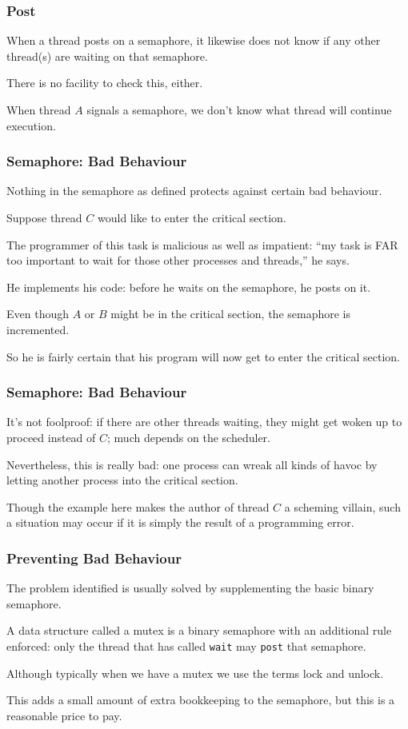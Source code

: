 \begin{frame}
	\frametitle{Post}

	When a thread posts on a semaphore, it likewise does not know if any other thread(s) are waiting on that semaphore.

	There is no facility to check this, either.

	When thread $A$ signals a semaphore, we don't know what thread will continue execution.


\end{frame}

\begin{frame}
	\frametitle{Semaphore: Bad Behaviour}

	Nothing in the semaphore as defined protects against certain bad behaviour.

	Suppose thread $C$ would like to enter the critical section.

	The programmer of this task is malicious as well as impatient: ``my task is FAR too important to wait for those other processes and threads,'' he says.

	He implements his code: before he waits on the semaphore, he posts on it.

	Even though $A$ or $B$ might be in the critical section, the semaphore is incremented.

	So he is fairly certain that his program will now get to enter the critical section.
\end{frame}

\begin{frame}
	\frametitle{Semaphore: Bad Behaviour}

	It's not foolproof: if there are other threads waiting, they might get woken up to proceed instead of $C$; much depends on the scheduler.

	Nevertheless, this is really bad: one process can wreak all kinds of havoc by letting another process into the critical section.

	Though the example here makes the author of thread $C$ a scheming villain, such a situation may occur if it is simply the result of a programming error.

\end{frame}

\begin{frame}
	\frametitle{Preventing Bad Behaviour}

	The problem identified is usually solved by supplementing the basic binary semaphore.

	A data structure called a \alert{mutex} is a binary semaphore with an additional rule enforced: only the thread that has called \texttt{wait} may \texttt{post} that semaphore.

	Although typically when we have a mutex we use the terms \alert{lock} and \alert{unlock}.

	This adds a small amount of extra bookkeeping to the semaphore, but this is a reasonable price to pay.

\end{frame}

